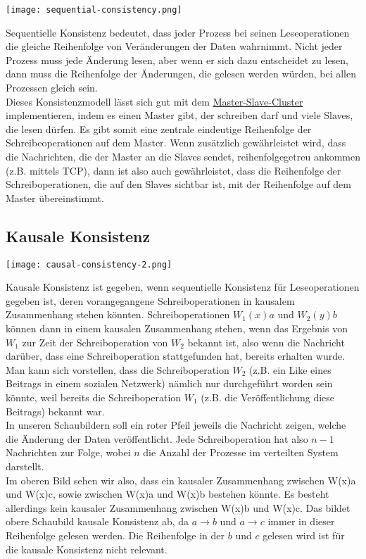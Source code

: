 \texttt{[image: sequential-consistency.png]}

Sequentielle Konsistenz bedeutet, dass jeder Prozess bei seinen Leseoperationen die gleiche Reihenfolge von Veränderungen der Daten wahrnimmt. Nicht jeder Prozess muss jede Änderung lesen, aber wenn er sich dazu entscheidet zu lesen, dann muss die Reihenfolge der Änderungen, die gelesen werden würden, bei allen Prozessen gleich sein. \\
Dieses Konsistenzmodell lässt sich gut mit dem \hyperref[sec:master-slave]{Master-Slave-Cluster} implementieren, indem es einen Master gibt, der schreiben darf und viele Slaves, die lesen dürfen. Es gibt somit eine zentrale eindeutige Reihenfolge der Schreibeoperationen auf dem Master. Wenn zusätzlich gewährleistet wird, dass die Nachrichten, die der Master an die Slaves sendet, reihenfolgegetreu ankommen (z.B. mittels TCP), dann ist also auch gewährleistet, dass die Reihenfolge der Schreiboperationen, die auf den Slaves sichtbar ist, mit der Reihenfolge auf dem Master übereinstimmt.

\subsection{Kausale Konsistenz}

\texttt{[image: causal-consistency-2.png]}

Kausale Konsistenz ist gegeben, wenn sequentielle Konsistenz für Leseoperationen gegeben ist, deren vorangegangene Schreiboperationen in kausalem Zusammenhang stehen könnten. Schreiboperationen $W_{1}(x)a$ und $W_{2}(y)b$ können dann in einem kausalen Zusammenhang stehen, wenn das Ergebnis von $W_{1}$ zur Zeit der Schreiboperation von $W_{2}$ bekannt ist, also wenn die Nachricht darüber, dass eine Schreiboperation stattgefunden hat, bereits erhalten wurde. Man kann sich vorstellen, dass die Schreiboperation $W_{2}$ (z.B. ein Like eines Beitrags in einem sozialen Netzwerk) nämlich nur durchgeführt worden sein könnte, weil bereits die Schreiboperation $W_{1}$ (z.B. die Veröffentlichung diese Beitrags) bekannt war. \\

In unseren Schaubildern soll ein roter Pfeil jeweils die Nachricht zeigen, welche die Änderung der Daten veröffentlicht. Jede Schreiboperation hat also $n-1$ Nachrichten zur Folge, wobei $n$ die Anzahl der Prozesse im verteilten System darstellt.\\
Im oberen Bild sehen wir also, dass ein kausaler Zusammenhang zwischen W(x)a und W(x)c, sowie zwischen W(x)a und W(x)b bestehen könnte. Es besteht allerdings kein kausaler Zusammenhang zwischen W(x)b und W(x)c. Das bildet obere Schaubild kausale Konsistenz ab, da $a \rightarrow b $ und $a \rightarrow c$ immer in dieser Reihenfolge gelesen werden. Die Reihenfolge in der $b$ und $c$ gelesen wird ist für die kausale Konsistenz nicht relevant. \\

